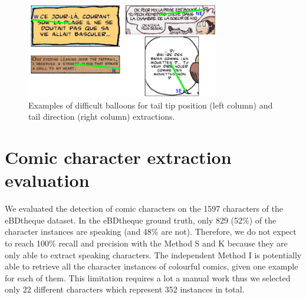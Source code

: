   \begin{figure}[h]  %
    \centering
    \includegraphics[trim= 0px 0px 0px 0px, clip, width=0.75\textwidth]{tail_extraction_errors.png}
    \caption[Examples of difficult balloons for tail tip position and tail direction extractions]{Examples of difficult balloons for tail tip position (left column) and tail direction (right column) extractions.}
    \label{fig:ex:tail_extraction_mistake_errors}
  \end{figure}






\section{Comic character extraction evaluation} %
\label{sec:comic_character_extraction_evaluation}
We evaluated the detection of comic characters on the 1597 characters of the eBDtheque dataset.
In the eBDtheque ground truth, only 829 (52\%) of the character instances are speaking (and 48\% are not).
Therefore, we do not expect to reach 100\% recall and precision with the Method S and K because they are only able to extract speaking characters.
The independent Method I is potentially able to retrieve all the character instances of colourful comics, given one example for each of them.
This limitation requires a lot a manual work thus we selected only 22 different characters which represent 352 instances in total.


